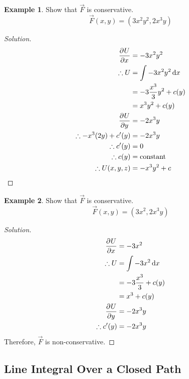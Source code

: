 \documentclass[fleqn]{article}
\theoremstyle{definition}
\newtheorem{example}{Example}
\theoremstyle{theorem}
\newenvironment{solution}
{\begin{proof}[Solution]\let\qed\relax}
	{\end{proof}}
\begin{document}
\begin{example}
	Show that $\overrightarrow{F}$ is conservative.
	\begin{equation*}
		\overrightarrow{F}(x, y) = (3 x^2 y^2 , 2 x^3 y)
	\end{equation*}
\end{example}

\begin{solution}
	\begin{align*}
		\dpd{U}{x} &= - 3 x^2 y^2 \\
		\therefore U &= \int\displaylimits -3 x^2 y^2 \dif x \\
		&= -3 \dfrac{x^3}{3} y^2 + c(y) \\
		&= x^3 y^2 + c(y) \\
		\dpd{U}{y} &= -2 x^3 y \\
		\therefore - x^3 (2y) + c'(y) &= -2 x^3 y \\
		\therefore c'(y) &= 0 \\
		\therefore c(y) &= \text{constant} \\
		\therefore U(x, y, z) &= -x^3 y^2 + c
	\end{align*}
\end{solution}

\begin{example}
	Show that $\overrightarrow{F}$ is conservative.
	\begin{equation*}
	\overrightarrow{F}(x, y) = (3 x^2 , 2 x^3 y)
	\end{equation*}
\end{example}

\begin{solution}
	\begin{align*}
		\dpd{U}{x} &= - 3 x^2 \\
		\therefore U &= \int\displaylimits -3 x^2 \dif x \\
		&= -3 \dfrac{x^3}{3} + c(y) \\
		&= x^3 + c(y) \\
		\dpd{U}{y} &= -2 x^3 y \\
		\therefore c'(y) &= -2 x^3 y 
	\end{align*}
	Therefore, $\overrightarrow{F}$ is non-conservative.
\end{solution}

\subsection{Line Integral Over a Closed Path}
\end{document}
